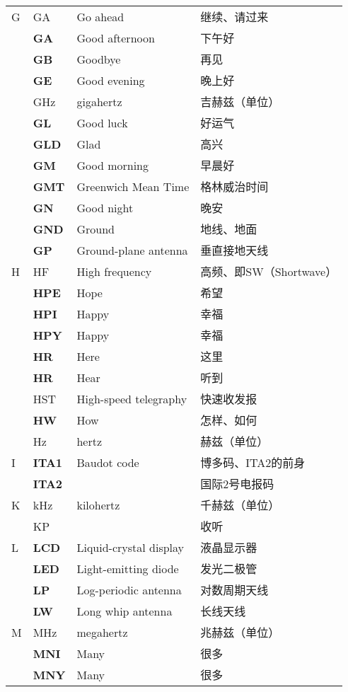 \begin{longtable}[l]{llll}
G & GA & Go ahead & 继续、请过来 \\
& \textbf{GA} & Good afternoon & 下午好 \\
& \textbf{GB} & Goodbye & 再见 \\
& \textbf{GE} & Good evening & 晚上好 \\
& \si{\GHz} & gigahertz & 吉赫兹（单位） \\
& \textbf{GL} & Good luck & 好运气 \\
& \textbf{GLD} & Glad & 高兴 \\
& \textbf{GM} & Good morning & 早晨好 \\
& \textbf{GMT} & Greenwich Mean Time & 格林威治时间 \\ %
& \textbf{GN} & Good night & 晚安 \\
& \textbf{GND} & Ground & 地线、地面 \\
& \textbf{GP} & Ground-plane antenna & 垂直接地天线 \\
H & HF & High frequency & 高频、即SW（Shortwave） \\
& \textbf{HPE} & Hope & 希望 \\
& \textbf{HPI} & Happy & 幸福 \\
& \textbf{HPY} & Happy & 幸福 \\
& \textbf{HR} & Here & 这里 \\
& \textbf{HR} & Hear & 听到 \\
& HST & High-speed telegraphy & 快速收发报 \\
& \textbf{HW} & How & 怎样、如何 \\
& Hz & hertz & 赫兹（单位） \\
I & \textbf{ITA1} & Baudot code & 博多码、ITA2的前身 \\
& \textbf{ITA2} & & 国际2号电报码 \\
K & \si{\kHz} & kilohertz & 千赫兹（单位） \\
& KP & & 收听 \\
L & \textbf{LCD} & Liquid-crystal display & 液晶显示器 \\
& \textbf{LED} & Light-emitting diode & 发光二极管 \\
& \textbf{LP} & Log-periodic antenna & 对数周期天线 \\
& \textbf{LW} & Long whip antenna & 长线天线 \\
M & \si{\MHz} & megahertz & 兆赫兹（单位） \\
& \textbf{MNI} & Many & 很多 \\
& \textbf{MNY} & Many & 很多 \\

\end{longtable}
